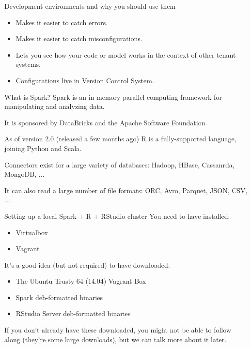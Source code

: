 \documentclass[pdf]{beamer}
\begin{document}
\begin{frame}{Development environments and why you should use them}
    \begin{itemize}
	\item Makes it easier to catch errors.
	\item Makes it easier to catch misconfigurations.
	\item Lets you see how your code or model works in the context of other tenant systems.
	\item Configurations live in Version Control System.
    \end{itemize}
\end{frame}

\begin{frame}{What is Spark?}
    Spark is an in-memory parallel computing framework for manipulating and analyzing data.

\vspace{10pt}

    It is sponsored by DataBricks and the Apache Software Foundation.

\vspace{10pt}

    As of version 2.0 (released a few months ago) R is a fully-supported language, joining Python and Scala.

\vspace{10pt}

    Connectors exist for a large variety of databases: Hadoop, HBase, Cassanrda, MongoDB, ...

\vspace{10pt}

    It can also read a large number of file formats: ORC, Avro, Parquet, JSON, CSV, ....
\end{frame}

\begin{frame}{Setting up a local Spark + R + RStudio cluster}
    You need to have installed:
    \begin{itemize}
	\item Virtualbox
	\item Vagrant
    \end{itemize}

    It's a good idea (but not required) to have downloaded:
    \begin{itemize}
	\item The Ubuntu Trusty 64 (14.04) Vagrant Box
	\item Spark deb-formatted binaries
	\item RStudio Server deb-formatted binaries
    \end{itemize}

    If you don't already have these downloaded, you might not be able to follow along (they're some large downloads), but we can talk more about it later.
\end{frame}
\end{document}

